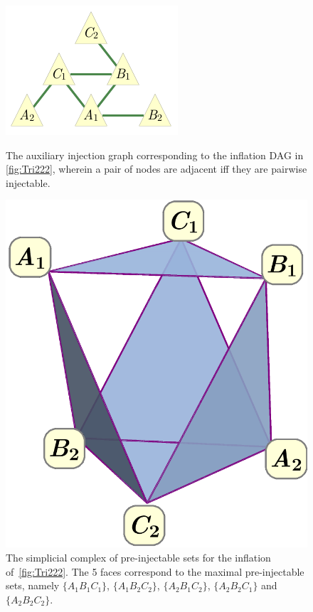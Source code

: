 \begin{figure}[t]
\centering
\begin{minipage}[b]{0.4\linewidth}
\centering
\includegraphics[scale=1]{injectiongraph222.pdf}
\caption{The auxiliary injection graph corresponding to the inflation DAG in \cref{fig:Tri222}, wherein a pair of nodes are adjacent iff they are pairwise injectable.}\label{fig:injection222}
\end{minipage}
\hfill
\begin{minipage}[b]{0.5\linewidth}
\centering
\includegraphics[scale=0.25]{simplicialcomplex.pdf}
\caption{The simplicial complex of pre-injectable sets for the inflation of~\cref{fig:Tri222}. The 5 faces correspond to the maximal pre-injectable sets, namely $\{A_1 B_1 C_1\}$, $\{A_1 B_2 C_2\}$, $\{A_2 B_1 C_2\}$, $\{A_2 B_2 C_1\}$ and $\{A_2 B_2 C_2\}$.}\label{fig:simplicialcomplex222}
\end{minipage}
\end{figure}

